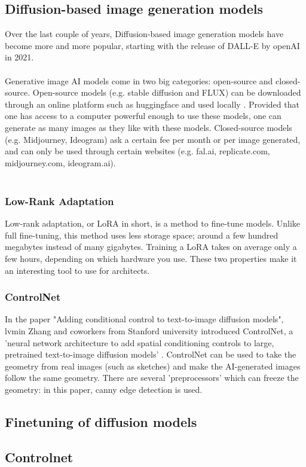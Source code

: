 \subsection{Diffusion-based image generation models}
Over the last couple of years, Diffusion-based image generation models have become more and more popular, starting with the release of DALL-E by openAI in 2021. \\
\\
Generative image AI models come in two big categories: open-source and closed-source. Open-source models (e.g. stable diffusion and FLUX) can be downloaded through an online platform such as huggingface and used locally . Provided that one has access to a computer powerful enough to use these models, one can generate as many images as they like with these models. Closed-source models (e.g. Midjourney, Ideogram) ask a certain fee per month or per image generated, and can only be used through certain websites (e.g. fal.ai, replicate.com, midjourney.com, ideogram.ai).\\ 
\\

\subsubsection{Low-Rank Adaptation}
Low-rank adaptation, or LoRA in short, is a method to fine-tune models. Unlike full fine-tuning, this method uses less storage space; around a few hundred megabytes instead of many gigabytes. Training a LoRA takes on average only a few hours, depending on which hardware you use. These two properties make it an interesting tool to use for architects.

\subsubsection{ControlNet}
In the paper "Adding conditional control to text-to-image diffusion models", lvmin Zhang and coworkers from Stanford university introduced ControlNet, a 'neural network architecture to add spatial conditioning controls to large, pretrained text-to-image diffusion models' \cite{zhang_adding_2023}. ControlNet can be used to take the geometry from real images (such as sketches) and make the AI-generated images follow the same geometry. There are several 'preprocessors' which can freeze the geometry: in this paper, canny edge detection is used.
\subsection{Finetuning of diffusion models}
\subsection{Controlnet}
